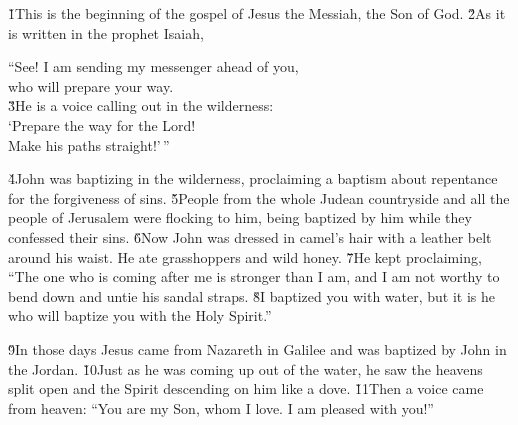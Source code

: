 


\v{1}This is the beginning of the gospel of Jesus the Messiah, the Son of God. \v{2}As it is written in the prophet Isaiah,

\begin{poetry}
\poeml ``See! I am sending my messenger ahead of you, \\
\poemll    who will prepare your way. \\
\poeml \v{3}He is a voice calling out in the wilderness: \\
\poemll    `Prepare the way for the Lord! \\
\poemlll       Make his paths straight!'\,''
\end{poetry}

\v{4}John was baptizing in the wilderness, proclaiming a baptism about repentance for the forgiveness of sins. \v{5}People from the whole Judean countryside and all the people of Jerusalem were flocking to him, being baptized by him while they confessed their sins. \v{6}Now John was dressed in camel's hair with a leather belt around his waist. He ate grasshoppers and wild honey. \v{7}He kept proclaiming, ``The one who is coming after me is stronger than I am, and I am not worthy to bend down and untie his sandal straps. \v{8}I baptized you with water, but it is he who will baptize you with the Holy Spirit.''

\v{9}In those days Jesus came from Nazareth in Galilee and was baptized by John in the Jordan. \v{10}Just as he was coming up out of the water, he saw the heavens split open and the Spirit descending on him like a dove. \v{11}Then a voice came from heaven: ``You are my Son, whom I love. I am pleased with you!''

